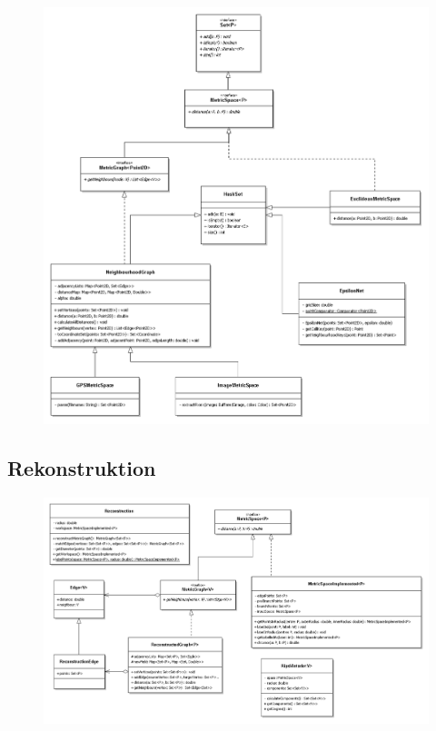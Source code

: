 \documentclass[parskip=half,
 fontsize=12pt, bibtotoc,
 ngerman]
 {article}
\begin{document}
\begin{figure}[h]
\centering
\includegraphics[scale=0.5]{preprocessing.png}
\end{figure}

\subsection{Rekonstruktion}

\begin{figure}[h]
\centering
\includegraphics[scale=0.5]{main.png}
\end{figure}
\end{document}
